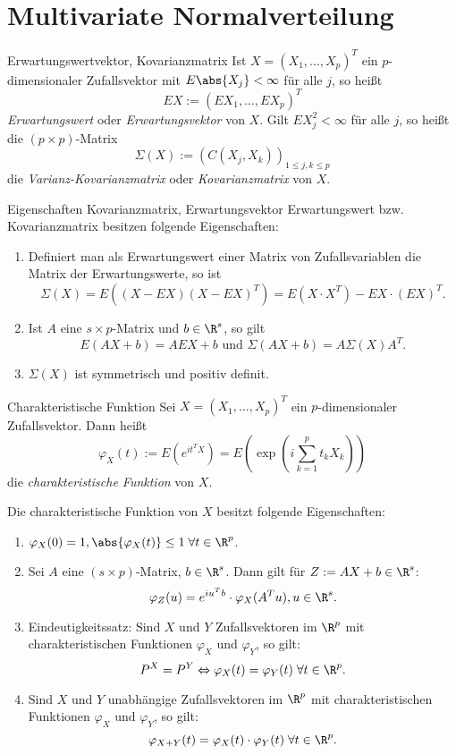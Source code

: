 \section{Multivariate Normalverteilung}

\begin{karte}{Erwartungswertvektor, Kovarianzmatrix}
Ist \(X = (X_1, \ldots, X_p)^T\) ein \(p\)-dimensionaler Zufallsvektor 
mit \(E \abs{X_j} < \infty\) für alle \(j\), so heißt 
\[ EX := (E X_1, \ldots, E X_p)^T \]
\textit{Erwartungswert} oder \textit{Erwartungsvektor} von \(X\). 
Gilt \(E X_j^2 < \infty\) für alle \(j\), so heißt die \((p\times p)\)-Matrix 
\[ \Sigma(X) := (C(X_j, X_k))_{1\leq j, k\leq p} \]
die \textit{Varianz-Kovarianzmatrix} oder \textit{Kovarianzmatrix} von \(X\).
\end{karte}

\begin{karte}{Eigenschaften Kovarianzmatrix, Erwartungsvektor}
Erwartungswert bzw. Kovarianzmatrix besitzen folgende Eigenschaften: 
\begin{enumerate}
    \item Definiert man als Erwartungswert einer Matrix von Zufallsvariablen die Matrix der Erwartungswerte, so ist 
    \[ \Sigma(X) = E((X-EX) (X - EX)^T) = E(X \cdot X^T) - EX \cdot (EX)^T. \]
    \item Ist \(A\) eine \(s\times p\)-Matrix und \(b\in \R^s\), so gilt 
    \[ E(AX+b) = A EX + b \text{ und } \Sigma(AX+b) = A \Sigma(X) A^T. \]
    \item \(\Sigma(X)\) ist symmetrisch und positiv definit.
\end{enumerate}
\end{karte}

\begin{karte}{Charakteristische Funktion}
Sei \(X = (X_1, \ldots, X_p)^T\) ein \(p\)-dimensionaler Zufallsvektor. Dann heißt 
\[ \varphi_X(t) := E(e^{it^T X}) = E\left( \exp\left( i \sum_{k=1}^p t_k X_k \right) \right) \]
die \textit{charakteristische Funktion} von \(X\).

Die charakteristische Funktion von \(X\) besitzt folgende Eigenschaften:
\begin{enumerate}
    \item \(\varphi_X(0) = 1, \abs{\varphi_X(t)} \leq 1 \;\forall t\in \R^p\).
    \item Sei \(A\) eine \((s\times p)\)-Matrix, \(b\in \R^s\). Dann gilt für \(Z := AX + b \in \R^s\):
    \[ \varphi_Z(u) = e^{i u^T b} \cdot \varphi_X(A^T u), u\in \R^s. \]
    \item Eindeutigkeitssatz: Sind \(X\) und \(Y\) Zufallsvektoren im \(\R^p\) mit 
    charakteristischen Funktionen \(\varphi_X\) und \(\varphi_Y\), so gilt: 
    \[ P^X = P^Y \Leftrightarrow \varphi_X(t) = \varphi_Y(t) \;\forall t\in \R^p. \]
    \item Sind \(X\) und \(Y\) unabhängige Zufallsvektoren im \(\R^p\) mit charakteristischen 
    Funktionen \(\varphi_X\) und \(\varphi_Y\), so gilt: 
    \[ \varphi_{X+Y}(t) = \varphi_X(t) \cdot \varphi_Y(t) \;\forall t\in \R^p. \]
\end{enumerate}
\end{karte}

